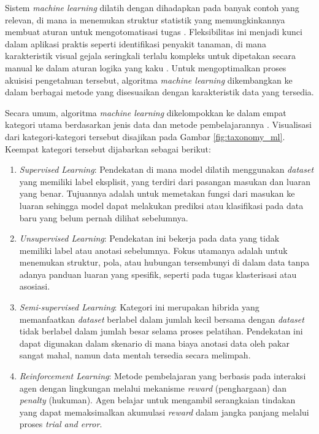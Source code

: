 Sistem \textit{machine learning} dilatih dengan dihadapkan pada banyak contoh yang relevan, di mana ia menemukan struktur statistik yang memungkinkannya membuat aturan untuk mengotomatisasi tugas \parencite{cholletDeepLearningPython2026}. Fleksibilitas ini menjadi kunci dalam aplikasi praktis seperti identifikasi penyakit tanaman, di mana karakteristik visual gejala seringkali terlalu kompleks untuk dipetakan secara manual ke dalam aturan logika yang kaku \parencite{pacalSystematicReviewDeep2024}. Untuk mengoptimalkan proses akuisisi pengetahuan tersebut, algoritma \textit{machine learning} dikembangkan ke dalam berbagai metode yang disesuaikan dengan karakteristik data yang tersedia.

Secara umum, algoritma \textit{machine learning} dikelompokkan ke dalam empat kategori utama berdasarkan jenis data dan metode pembelajarannya \parencite{sarkerMachineLearningAlgorithms2021}. Visualisasi dari kategori-kategori tersebut disajikan pada Gambar \ref{fig:taxonomy_ml}. Keempat kategori tersebut dijabarkan sebagai berikut:
\begin{enumerate}[nosep]
    \item \textit{Supervised Learning}: Pendekatan di mana model dilatih menggunakan \textit{dataset} yang memiliki label eksplisit, yang terdiri dari pasangan masukan dan luaran yang benar. Tujuannya adalah untuk memetakan fungsi dari masukan ke luaran sehingga model dapat melakukan prediksi atau klasifikasi pada data baru yang belum pernah dilihat sebelumnya.
    \item \textit{Unsupervised Learning}: Pendekatan ini bekerja pada data yang tidak memiliki label atau anotasi sebelumnya. Fokus utamanya adalah untuk menemukan struktur, pola, atau hubungan tersembunyi di dalam data tanpa adanya panduan luaran yang spesifik, seperti pada tugas klasterisasi atau asosiasi.
    \item \textit{Semi-supervised Learning}: Kategori ini merupakan hibrida yang memanfaatkan \textit{dataset} berlabel dalam jumlah kecil bersama dengan \textit{dataset} tidak berlabel dalam jumlah besar selama proses pelatihan. Pendekatan ini dapat digunakan dalam skenario di mana biaya anotasi data oleh pakar sangat mahal, namun data mentah tersedia secara melimpah.
    \item \textit{Reinforcement Learning}: Metode pembelajaran yang berbasis pada interaksi agen dengan lingkungan melalui mekanisme \textit{reward} (penghargaan) dan \textit{penalty} (hukuman). Agen belajar untuk mengambil serangkaian tindakan yang dapat memaksimalkan akumulasi \textit{reward} dalam jangka panjang melalui proses \textit{trial and error}.
\end{enumerate}


